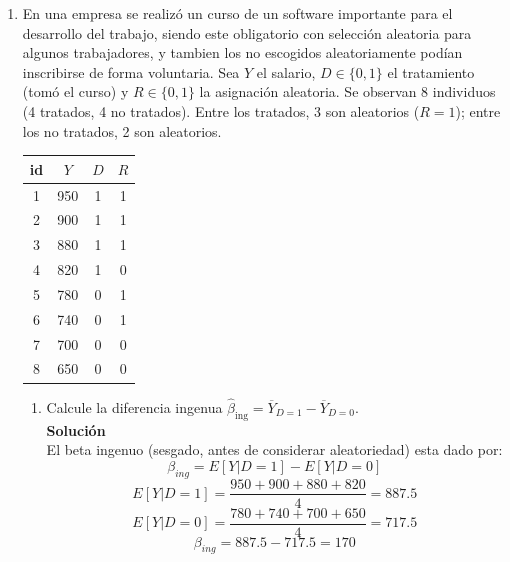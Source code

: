 \documentclass[10pt,a4paper]{article}
\begin{document}
\begin{enumerate}
\begin{enumerate}
{    \[
\text{Var}(\hat{\beta}|X) = \hat{\sigma}^2(X^{\top}X)^{-1}
\]

Solo necesitamos la varianza de los estimadores así que  os quedamos con los elementos de la diagonal de la matriz de var-covar.

$$\text{Var}(\hat{\beta_0}|X)=10,1643\quad 
\text{Var}(\hat{\beta_1}|X)=0,5979
\quad \text{Var}(\hat{\beta_2}|X)=0,0478$$}
\end{enumerate}

\item En una empresa se realizó un curso de un software importante para el desarrollo del trabajo, siendo este obligatorio con selección aleatoria para algunos trabajadores, y tambien los no escogidos aleatoriamente podían inscribirse de forma voluntaria.
Sea $Y$ el salario, $D\in\{0,1\}$ el tratamiento (tomó el curso) y $R\in\{0,1\}$ la asignación aleatoria.
Se observan 8 individuos (4 tratados, 4 no tratados). Entre los tratados, 3 son aleatorios ($R=1$); entre los no tratados, 2 son aleatorios.

\begin{center}
\begin{tabular}{|c| c |c |c|}
\hline
id & $Y$ & $D$ & $R$\\
\hline
1 & 950 & 1 & 1\\
2 & 900 & 1 & 1\\
3 & 880 & 1 & 1\\
4 & 820 & 1 & 0\\
5 & 780 & 0 & 1\\
6 & 740 & 0 & 1\\
7 & 700 & 0 & 0\\
8 & 650 & 0 & 0\\
\hline
\end{tabular}
\end{center}

\begin{enumerate}
\item Calcule la diferencia ingenua $\hat\beta_{\text{ing}}=\overline{Y}_{D=1}-\overline{Y}_{D=0}$.
\\
\textbf{Solución}
\\
El beta ingenuo (sesgado, antes de considerar aleatoriedad) esta dado por:
$$\beta_{ing}=E[Y|D=1]-E[Y|D=0]$$
$$E[Y|D=1] = \frac{950+900+880+820}{4}=887.5$$
$$E[Y|D=0]=\frac{780+740+700+650}{4}=717.5$$
$$\beta_{ing}=887.5-717.5=170$$


\end{enumerate}
\end{enumerate}
\end{document}
